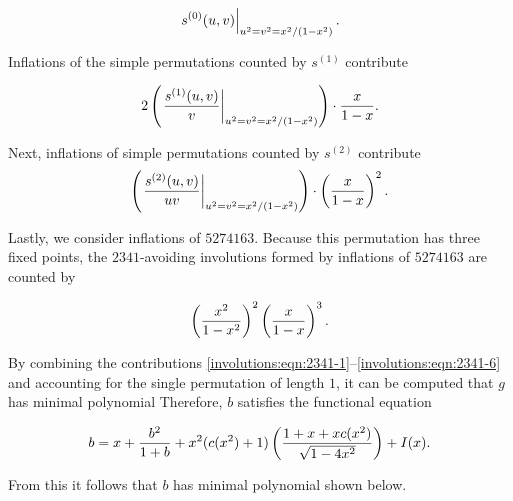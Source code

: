     \begin{equation}
    \label{involutions:eqn:2341-3}
      \eval{s^{(0)}(u,v)}_{u^2=v^2=x^2/(1-x^2)}.
    \end{equation}

    Inflations of the simple permutations counted by $s^{(1)}$ contribute

    \begin{equation}
      \label{involutions:eqn:2341-4}
      2\pa{\eval{\frac{s^{(1)}(u,v)}{v}}_{u^2=v^2=x^2/(1-x^2)}}
      \cdot
      \frac{x}{1-x}.
    \end{equation}

    Next, inflations of simple permutations counted by $s^{(2)}$ contribute
      \begin{equation}
      \label{involutions:eqn:2341-5}
      \pa{\eval{\frac{s^{(2)}(u,v)}{uv}}_{u^2=v^2=x^2/(1-x^2)}}
      \cdot
      \pa{\frac{x}{1-x}}^2.
    \end{equation}


    Lastly, we consider inflations of $5274163$. Because this permutation has
    three fixed points, the $2341$-avoiding involutions formed by inflations of
    $5274163$ are counted by

    \begin{equation}
    \label{involutions:eqn:2341-6}
    \left({\frac{x^2}{1-x^2}}\right)^2\left({\frac{x}{1-x}}\right)^3.
    \end{equation}

    By combining the contributions
    \eqref{involutions:eqn:2341-1}--\eqref{involutions:eqn:2341-6} and
    accounting for the single permutation of length $1$, it can be computed
    that $g$ has minimal polynomial Therefore, $b$ satisfies the functional
    equation
    	
    $$ b = x + \frac{b^2}{1+b} +  x^2(c(x^2)+1)\left({\frac{1 + x +
    xc(x^2)}{\sqrt{1-4x^2}}}\right) + I(x). $$

    From this it follows that $b$ has minimal polynomial shown below. 



